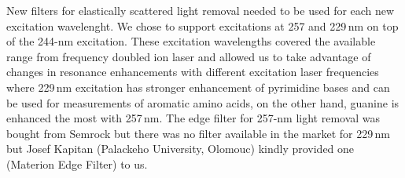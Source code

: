 New filters for elastically scattered light removal needed to be used for each
new excitation wavelenght. We chose to support excitations at 257 and 229\,nm
on top of the 244-nm excitation.
These excitation wavelengths covered the available range from frequency doubled
 ion laser and allowed us to take advantage of changes in resonance
enhancements with different excitation laser frequencies where 229\,nm
excitation has stronger enhancement of pyrimidine bases and can be used for
measurements of aromatic amino acids, on the other hand, guanine is
enhanced the most with 257\,nm.
The edge filter for 257-nm light removal was bought from Semrock but there was
no filter available in the market for 229\,nm but Josef Kapitan (Palackeho
University, Olomouc) kindly provided one (Materion Edge Filter) to us.
